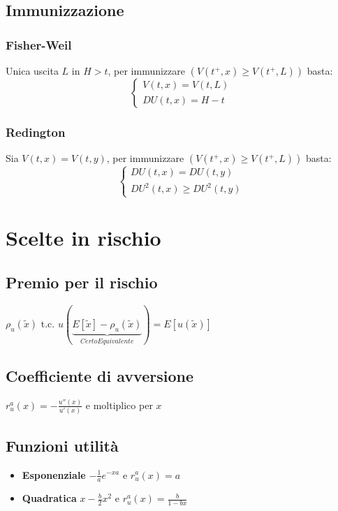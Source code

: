 \documentclass[a4paper,notitlepage]{report}%
\begin{document}
\begin{multicols*}{2}
    \subsection*{Immunizzazione}

        \subsubsection*{Fisher-Weil}
        Unica uscita $L$ in $H>t$, per immunizzare $(V(t^+,x)\geq V(t^+,L))$ basta:
        \[
            \left\{\begin{array}{l}
                V(t,x) = V(t,L)\\
                DU(t,x)=H-t
            \end{array}\right.
        \]

        \subsubsection*{Redington}
        Sia $V(t,x) = V(t,y)$, per immunizzare $(V(t^+,x)\geq V(t^+,L))$ basta:
        \[
            \left\{\begin{array}{l}
                DU(t,x)=DU(t,y) \\
                DU^2(t,x) \geq DU^2(t,y)
            \end{array}\right.
        \]

\section*{Scelte in rischio}

    \subsection*{Premio per il rischio}
    $\rho_u(\tilde{x})$ t.c. $u(\underbrace{E[\tilde{x}]-\rho_u(\tilde{x})}_{Certo Equivalente})=E[u(\tilde{x})]$

    \subsection*{Coefficiente di avversione}
    $r^a_u(x)=-\frac{u''(x)}{u'(x)}$ e moltiplico per $x$

    \subsection*{Funzioni utilità}
    \begin{itemize}
        \item \textbf{Esponenziale} $-\frac{1}{a}e^{-xa}$ e $r_u^a(x)=a$
        \item \textbf{Quadratica} $x-\frac{b}{2}x^2$ e $r_u^a(x)=\frac{b}{1-bx}$
    \end{itemize}


\end{multicols*}
\end{document}
